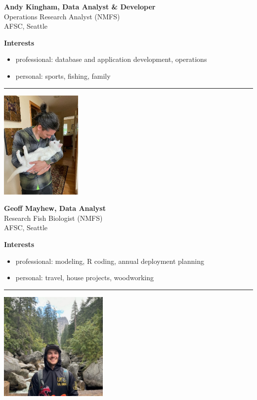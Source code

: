 \documentclass[
  letterpaper,
  DIV=11,
  numbers=noendperiod]{scrreprt}
\providecommand{\tightlist}{%
  \setlength{\itemsep}{0pt}\setlength{\parskip}{0pt}}\usepackage{longtable,booktabs,array}
\begin{document}
\textbf{Andy Kingham, Data Analyst \& Developer}\\
Operations Research Analyst (NMFS)\\
AFSC, Seattle

\textbf{Interests}

\begin{itemize}
\tightlist
\item
  professional: database and application development, operations\\
\item
  personal: sports, fishing, family
\end{itemize}

\begin{center}\rule{0.5\linewidth}{0.5pt}\end{center}

\includegraphics[width=\textwidth,height=2.08333in]{_img/GeoffMayhew.jpg}

\textbf{Geoff Mayhew, Data Analyst}\\
Research Fish Biologist (NMFS)\\
AFSC, Seattle

\textbf{Interests}

\begin{itemize}
\tightlist
\item
  professional: modeling, R coding, annual deployment planning\\
\item
  personal: travel, house projects, woodworking
\end{itemize}

\begin{center}\rule{0.5\linewidth}{0.5pt}\end{center}

\includegraphics[width=\textwidth,height=2.08333in]{_img/CameronVanHorn.jpg}
\end{document}
